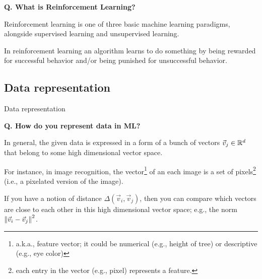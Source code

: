\begin{frame}[fragile]{\textbf{Q. What is Reinforcement Learning?}}
  \begin{wideitemize}
    \item Reinforcement learning is one of three basic machine learning paradigms, alongside
    supervised learning and unsupervised learning.
    \item In reinforcement learning an algorithm learns to do something by being
    rewarded for successful behavior and/or being punished for unsuccessful behavior.
  \end{wideitemize}
\end{frame}


\subsection{Data representation}
\begin{transitionsubframe}
  \begin{center}
    \Huge Data representation
  \end{center}
\end{transitionsubframe}

\begin{frame}[fragile]{\textbf{Q. How do you represent data in ML?}}
  \begin{wideitemize}
    \item In general, the given data is expressed in a form of a bunch of vectors
    $\vec{v}_{j} \in {\Bbb R}^{d}$ that belong to some high dimensional vector space.
    \item For instance, in image recognition, the vector\footnote{a.k.a., feature
    vector; it could be numerical (e.g., height of tree) or descriptive
    (e.g., eye color)} of an each image is a set of pixels\footnote{each entry
    in the vector (e.g., pixel) represents a feature.} (i.e., a pixelated
    version of the image).
    \item If you have a notion of distance $\Delta(\vec{v}_{i}, \vec{v}_{j})$,
    then you can compare which vectors are close to each other in this high
    dimensional vector space; e.g., the norm $\left\lVert \vec{v}_{i} - \vec{v}_{j} \right\rVert^2$.
  \end{wideitemize}
\end{frame}

